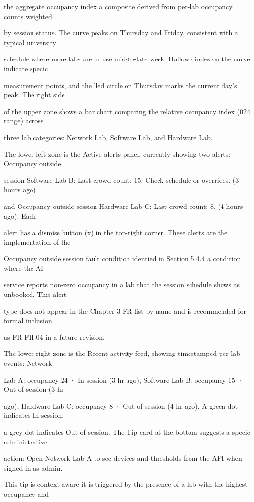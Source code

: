 the aggregate occupancy index  a composite derived from per-lab occupancy counts weighted

by session status. The curve peaks on Thursday and Friday, consistent with a typical university

schedule where more labs are in use mid-to-late week. Hollow circles on the curve indicate specic

measurement points, and the lled circle on Thursday marks the current day's peak. The right side

of the upper zone shows a bar chart comparing the relative occupancy index (024 range) across

three lab categories: Network Lab, Software Lab, and Hardware Lab.

The lower-left zone is the Active alerts panel, currently showing two alerts: Occupancy outside

session  Software Lab B: Last crowd count: 15. Check schedule or overrides. (3 hours ago)

and Occupancy outside session  Hardware Lab C: Last crowd count: 8. (4 hours ago). Each

alert has a dismiss button (x) in the top-right corner. These alerts are the implementation of the

Occupancy outside session fault condition identied in Section 5.4.4  a condition where the AI

service reports non-zero occupancy in a lab that the session schedule shows as unbooked. This alert

type does not appear in the Chapter 3 FR list by name and is recommended for formal inclusion

as FR-FH-04 in a future revision.

The lower-right zone is the Recent activity feed, showing timestamped per-lab events: Network

Lab A: occupancy 24 · In session (3 hr ago), Software Lab B: occupancy 15 · Out of session (3 hr

ago), Hardware Lab C: occupancy 8 · Out of session (4 hr ago). A green dot indicates In session;

a grey dot indicates Out of session. The Tip card at the bottom suggests a specic administrative

action: Open Network Lab A to see devices and thresholds from the API when signed in as admin.

This tip is context-aware  it is triggered by the presence of a lab with the highest occupancy and

